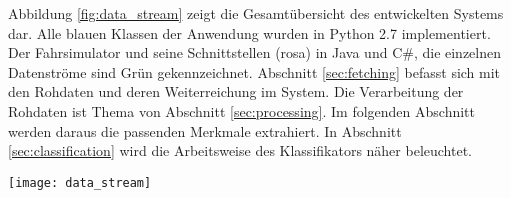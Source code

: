 \label{chap:implementation}

Abbildung \ref{fig:data_stream} zeigt die Gesamtübersicht des entwickelten Systems dar. Alle blauen Klassen der Anwendung wurden in Python 2.7 implementiert. Der Fahrsimulator und seine Schnittstellen (rosa) in Java und C\#, die einzelnen Datenströme sind Grün gekennzeichnet. Abschnitt \ref{sec:fetching} befasst sich mit den Rohdaten und deren Weiterreichung im System. Die Verarbeitung der Rohdaten ist Thema von Abschnitt \ref{sec:processing}. Im folgenden Abschnitt werden daraus die passenden Merkmale extrahiert. In Abschnitt \ref{sec:classification} wird die Arbeitsweise des Klassifikators näher beleuchtet. 


\begin{figure*} 
  \begin{center}
    \texttt{[image: data\_stream]}
    \caption[Aufbau der Anwendung]{Der Aufbau des entwickelten System zur Müdigkeitserkennung. \label{fig:data_stream}}
  \end{center}
\end{figure*}